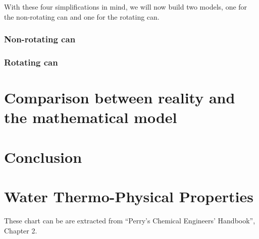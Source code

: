 \documentclass{report}
\begin{document}
	With these four simplifications in mind, we will now build two models, one for the non-rotating can and one for the rotating can.
	
	\subsection{Non-rotating can}\label{nrc}
	
	\subsection{Rotating can}
	
	\chapter[Reality and mathematical model]{Comparison between reality and the mathematical model}\label{rvmm}
	
	\chapter{Conclusion}\label{ccl}
	
	
	\appendix
	
	\chapter{Water Thermo-Physical Properties}\label{WTPP}
	
	These chart can be are extracted from ``Perry’s	Chemical Engineers’ Handbook'', Chapter 2\cite{properties}.
	
	
	
	{}
	
	
\end{document}

